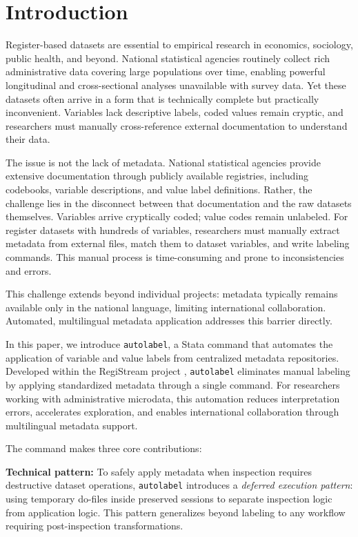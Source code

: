 \section{Introduction}

Register-based datasets are essential to empirical research in economics, sociology, public health, and beyond. National statistical agencies routinely collect rich administrative data covering large populations over time, enabling powerful longitudinal and cross-sectional analyses unavailable with survey data. Yet these datasets often arrive in a form that is technically complete but practically inconvenient. Variables lack descriptive labels, coded values remain cryptic, and researchers must manually cross-reference external documentation to understand their data.

The issue is not the lack of metadata. National statistical agencies provide extensive documentation through publicly available registries, including codebooks, variable descriptions, and value label definitions. Rather, the challenge lies in the disconnect between that documentation and the raw datasets themselves. Variables arrive cryptically coded; value codes remain unlabeled. For register datasets with hundreds of variables, researchers must manually extract metadata from external files, match them to dataset variables, and write labeling commands. This manual process is time-consuming and prone to inconsistencies and errors.

This challenge extends beyond individual projects: metadata typically remains available only in the national language, limiting international collaboration. Automated, multilingual metadata application addresses this barrier directly.

In this paper, we introduce \texttt{autolabel}, a Stata command that automates the application of variable and value labels from centralized metadata repositories. Developed within the RegiStream project \citep{registream2024}, \texttt{autolabel} eliminates manual labeling by applying standardized metadata through a single command. For researchers working with administrative microdata, this automation reduces interpretation errors, accelerates exploration, and enables international collaboration through multilingual metadata support.

The command makes three core contributions:

\textbf{Technical pattern:} To safely apply metadata when inspection requires destructive dataset operations, \texttt{autolabel} introduces a \emph{deferred execution pattern}: using temporary do-files inside preserved sessions to separate inspection logic from application logic. This pattern generalizes beyond labeling to any workflow requiring post-inspection transformations.

